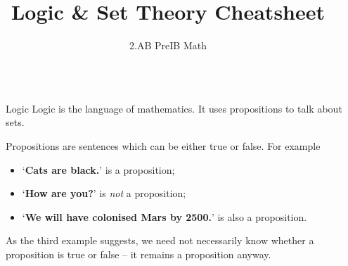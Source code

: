 \documentclass[final]{beamer}
\title{Logic \& Set Theory Cheatsheet}
\author{2.AB PreIB Math}
\institute[shortinst]{Adam Klepáč}
\newlength{\sepwidth}
\newlength{\colwidth}
\newcommand{\separatorcolumn}{
  \begin{column}{\sepwidth}
\end{column}}
\begin{document}

\begin{frame}[t]
  \begin{columns}[t]
    \separatorcolumn

    \begin{column}{\colwidth}

      \begin{block}{Logic}
        \alert{Logic} is the language of mathematics. It uses
        \alert{propositions} to
        talk about sets.

        Propositions are sentences which can be either true or false.
        For example
        \begin{itemize}[label=\textbullet,left=24pt]
          \item `\textbf{Cats are black.}' is a proposition;
          \item `\textbf{How are you?}' is \emph{not} a proposition;
          \item `\textbf{We will have colonised Mars by 2500.}' is
            also a proposition.
        \end{itemize}
      \end{block}
      As the third example suggests, we need not necessarily know whether a
      proposition is true or false -- it remains a proposition anyway.

      \vspace{1em}


\end{column}
\end{columns}
\end{frame}
\end{document}
